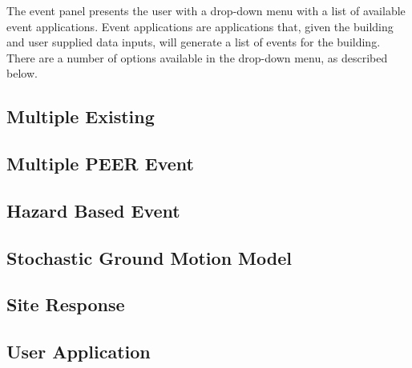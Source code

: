The event panel presents the user with a drop-down menu with a list of
available event applications. Event applications are applications
that, given the building and user supplied data inputs, will generate
a list of events for the building. There are a number of options
available in the drop-down menu, as described below.

\subsection{Multiple Existing}
\label{subsec:multi_existing}


\subsection{Multiple PEER Event}


\subsection{Hazard Based Event}


\subsection{Stochastic Ground Motion Model}


\subsection{Site Response}


\subsection{User Application}

